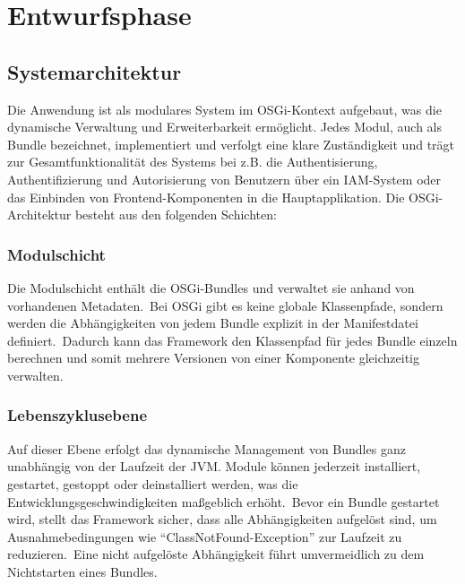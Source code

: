 \section{Entwurfsphase} 
\label{sec:Entwurfsphase}

\subsection{Systemarchitektur}
\label{subsec:Systemarchitektur}

Die Anwendung ist als modulares System im OSGi-Kontext aufgebaut, was die dynamische Verwaltung und Erweiterbarkeit ermöglicht.
Jedes Modul, auch als Bundle bezeichnet, implementiert und verfolgt eine klare Zuständigkeit und trägt zur Gesamtfunktionalität des Systems bei z.B.
die Authentisierung, Authentifizierung und Autorisierung von Benutzern über ein IAM-System oder das Einbinden von Frontend-Komponenten in die Hauptapplikation.
Die OSGi-Architektur besteht aus den folgenden Schichten:

\subsubsection{Modulschicht}
\label{subsubsec:Modulschicht}

Die Modulschicht enthält die OSGi-Bundles und verwaltet sie anhand von vorhandenen Metadaten.\ Bei OSGi gibt es keine globale Klassenpfade, sondern werden die
Abhängigkeiten von jedem Bundle explizit in der Manifestdatei definiert.\ Dadurch kann das Framework den Klassenpfad für jedes Bundle einzeln berechnen und somit mehrere
Versionen von einer Komponente gleichzeitig verwalten.

\subsubsection{Lebenszyklusebene}
\label{subsubsec:Lebenszyklusebene}

Auf dieser Ebene erfolgt das dynamische Management von Bundles ganz unabhängig von der Laufzeit der JVM. Module können jederzeit installiert, gestartet, gestoppt oder
deinstalliert werden, was die Entwicklungsgeschwindigkeiten maßgeblich erhöht.\ Bevor ein Bundle gestartet wird, stellt das Framework sicher,
dass alle Abhängigkeiten aufgelöst sind, um Ausnahmebedingungen wie "`ClassNotFound-Exception"' zur Laufzeit zu reduzieren.\ Eine nicht aufgelöste Abhängigkeit führt umvermeidlich
zu dem Nichtstarten eines Bundles.

